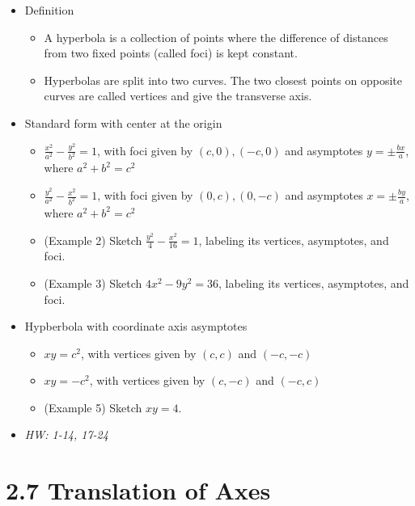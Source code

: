 \documentclass[11pt]{article}
\begin{document}
\begin{itemize}
  \item Definition
    \begin{itemize}
      \item A hyperbola is a collection of points where the difference of distances
            from two fixed points (called foci) is kept constant.
      \item Hyperbolas are split into two curves. The two closest points
            on opposite curves are called vertices and give the transverse axis.
    \end{itemize}
  \item Standard form with center at the origin
    \begin{itemize}
      \item \(\frac{x^2}{a^2}-\frac{y^2}{b^2}=1\), with foci given by
            \((c,0),(-c,0)\) and asymptotes \(y=\pm\frac{bx}{a}\),
            where \(a^2+b^2=c^2\)
      \item  \(\frac{y^2}{a^2}-\frac{x^2}{b^2}=1\), with foci given by
            \((0,c),(0,-c)\) and asymptotes \(x=\pm\frac{by}{a}\),
            where \(a^2+b^2=c^2\)
      \item (Example 2) Sketch \(\frac{y^2}{4}-\frac{x^2}{16}=1\), labeling
            its vertices, asymptotes, and foci.
      \item (Example 3) Sketch \(4x^2-9y^2=36\), labeling
            its vertices, asymptotes, and foci.
    \end{itemize}
  \item Hypberbola with coordinate axis asymptotes
    \begin{itemize}
      \item \(xy=c^2\), with vertices given by \((c,c)\) and \((-c,-c)\)
      \item \(xy=-c^2\), with vertices given by \((c,-c)\) and \((-c,c)\)
      \item (Example 5) Sketch \(xy=4\).
    \end{itemize}
  \item\textit{
    HW: 1-14, 17-24
  }
\end{itemize}

\section*{2.7 Translation of Axes}
\end{document}
